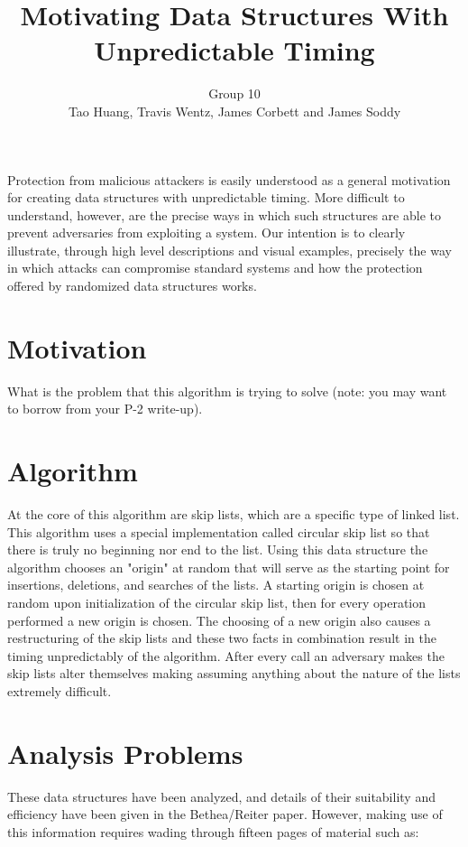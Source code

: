 \documentclass[11pt,twocolumn]{article}
\title{Motivating Data Structures With Unpredictable Timing}
\author{Group 10\\
\small{Tao Huang, Travis Wentz, James Corbett and James Soddy}}
\begin{document}
\maketitle

Protection from malicious attackers is easily understood as a general motivation
for creating data structures with unpredictable timing. More difficult to understand,
however, are the precise ways in which such structures are able to prevent adversaries
from exploiting a system. Our intention is to clearly illustrate, through
high level descriptions and visual examples, precisely the way in which attacks
can compromise standard systems and how the protection offered by randomized
data structures works.

\section{Motivation}
What is the problem that this algorithm is trying to solve (note: you may want 
to borrow from your P-2 write-up).

\section{Algorithm}
 At the core of this algorithm are skip lists, which are a specific type of linked list. This algorithm uses a special implementation called circular skip list so that there is truly no beginning nor end to the list. Using this data structure the algorithm chooses an "origin" at random that will serve as the starting point for insertions, deletions, and searches of the lists. A starting origin is chosen at random upon initialization of the circular skip list, then for every operation performed a new origin is chosen. The choosing of a new origin also causes a restructuring of the skip lists and these two facts in combination result in the timing unpredictably of the algorithm. After every call an adversary makes the skip lists alter themselves making assuming anything about the nature of the lists extremely difficult. 
\section{Analysis Problems}
These data structures have been analyzed, and details of their suitability and
efficiency have been given in the Bethea/Reiter paper\cite{Bethea09}. However,
making use of this information requires wading through fifteen pages of material such as:
\end{document}
